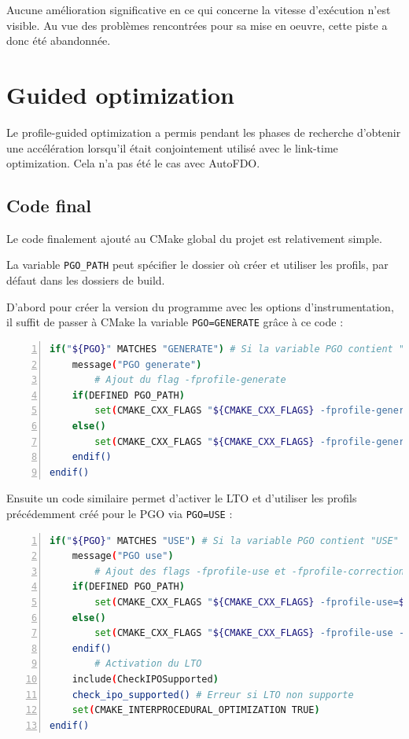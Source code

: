 \documentclass[a4paper,11pt]{report}
\begin{document}
Aucune amélioration significative en ce qui concerne la vitesse d'exécution n'est visible.
Au vue des problèmes rencontrées pour sa mise en oeuvre, cette piste a donc été abandonnée.

\section{Guided optimization}
Le profile-guided optimization a permis pendant les phases de recherche d'obtenir une accélération lorsqu'il était conjointement utilisé avec le link-time optimization.
Cela n'a pas été le cas avec AutoFDO.

\subsection{Code final}
Le code finalement ajouté au CMake global du projet est relativement simple.

La variable \verb'PGO_PATH' peut spécifier le dossier où créer et utiliser les profils, par défaut dans les dossiers de build.

D'abord pour créer la version du programme avec les options d'instrumentation, il suffit de passer à CMake la variable \verb'PGO=GENERATE' grâce à ce code :
\begin{lstlisting}[language=bash,numbers=left]
if("${PGO}" MATCHES "GENERATE") # Si la variable PGO contient "GENERATE"
	message("PGO generate")
        # Ajout du flag -fprofile-generate
	if(DEFINED PGO_PATH)
		set(CMAKE_CXX_FLAGS "${CMAKE_CXX_FLAGS} -fprofile-generate=${PGO_PATH}")
	else()
		set(CMAKE_CXX_FLAGS "${CMAKE_CXX_FLAGS} -fprofile-generate")
	endif()
endif()
\end{lstlisting}

Ensuite un code similaire permet d'activer le LTO et d'utiliser les profils précédemment créé pour le PGO via \verb'PGO=USE' :
\begin{lstlisting}[language=bash,numbers=left]
if("${PGO}" MATCHES "USE") # Si la variable PGO contient "USE"
	message("PGO use")
        # Ajout des flags -fprofile-use et -fprofile-correction
	if(DEFINED PGO_PATH)
		set(CMAKE_CXX_FLAGS "${CMAKE_CXX_FLAGS} -fprofile-use=${PGO_PATH} -fprofile-correction")
	else()
		set(CMAKE_CXX_FLAGS "${CMAKE_CXX_FLAGS} -fprofile-use -fprofile-correction")
	endif()
        # Activation du LTO
	include(CheckIPOSupported)
	check_ipo_supported() # Erreur si LTO non supporte
	set(CMAKE_INTERPROCEDURAL_OPTIMIZATION TRUE)
endif()
\end{lstlisting}
\end{document}
